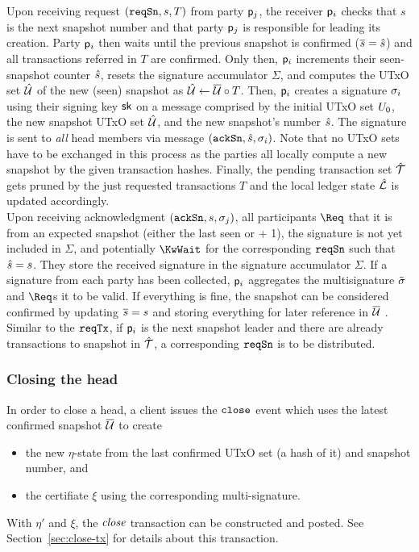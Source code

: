 \quad Upon receiving request $(\mathtt{reqSn},s,T)$ from party
$\mathsf p_j$, the receiver $\mathsf p_i$ checks that $s$ is the next snapshot number
and that party $\mathsf p_j$ is responsible for leading its creation. Party
$\mathsf p_i$ then waits until the previous snapshot is confirmed ($\overline s = \hat s$)
and all transactions referred in $T$  are
confirmed. Only then, $\mathsf p_i$ increments their seen-snapshot counter $\hat s$,
resets the signature accumulator $\Sigma$, and computes the UTxO set $\hat {\mathcal U}$ of
the new (seen) snapshot as $\hat {\mathcal U} \gets \overline {\mathcal U} \circ T$. Then, $\mathsf p_i$
creates a signature $\sigma_i$ using their signing key $\mathsf{sk}$ on a message
comprised by the initial UTxO set $U_{0}$, the new snapshot UTxO set $\hat {\mathcal U}$,
and the new snapshot's number $\hat s$. The signature is sent to \emph{all} head
members via message $(\mathtt{ackSn},\hat s,\sigma_i)$. Note that no UTxO sets have to be
exchanged in this process as the parties all locally compute a new snapshot by
the given transaction hashes. Finally, the pending transaction set $\hat {\mathcal T}$ gets
pruned by the just requested transactions $T$ and the local ledger state
$\hat {\mathcal L}$ is updated accordingly.\\

\quad Upon receiving acknowledgment $(\mathtt{ackSn},s,\sigma_j)$,
all participants $\Req$ that it is from an expected snapshot (either the last
seen or + 1), the signature is not yet included in $\Sigma$, and potentially
$\KwWait$ for the corresponding $\mathtt{reqSn}$ such that $\hat s = s$. They store the
received signature in the signature accumulator $\Sigma$. If a signature from
each party has been collected, $\mathsf p_i$ aggregates the multisignature
$\tilde \sigma$ and $\Req$s it to be valid.  If
everything is fine, the snapshot can be considered confirmed by updating
$\overline s=s$ and storing everything for later reference in $\overline {\mathcal U}$ . Similar to the $\mathtt{reqTx}$, if $\mathsf p_i$ is the next snapshot leader and there are already transactions to snapshot in $\hat {\mathcal T}$, a corresponding $\mathtt{reqSn}$ is to be distributed.

\subsubsection{Closing the head}

\quad In order to close a head, a client issues the
$\mathtt{close}$ event which uses the latest confirmed snapshot $\overline {\mathcal U}$ to create
\begin{itemize}
  \item the new $\eta$-state from the last confirmed UTxO set (a hash of it) and
        snapshot number, and
  \item the certifiate $\xi$ using the corresponding multi-signature.
\end{itemize}
With $\eta'$ and $\xi$, the $\textit{close}$ transaction can be constructed and
posted. See Section~\ref{sec:close-tx} for details about this transaction.
\\

